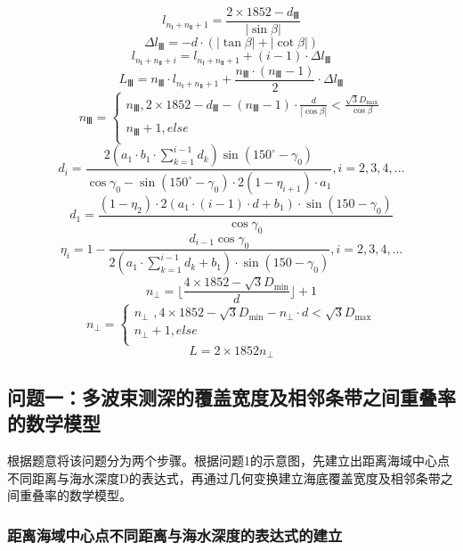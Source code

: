 \documentclass[withoutpreface,bwprint]{cumcmthesis} %
\begin{document}
$$
l_{n_Ⅰ+n_Ⅱ+1}=\frac{2\times 1852-d_Ⅲ}{\left| \sin \beta \right|}
$$
$$
\varDelta l_Ⅲ=-d\cdot \left( \left| \tan \beta \right|+\left| \cot \beta \right| \right) 
$$
$$
l_{n_Ⅰ+n_Ⅱ+i}=l_{n_Ⅰ+n_Ⅱ+1}+\left( i-1 \right) \cdot \varDelta l_Ⅲ
$$
$$
L_Ⅲ=n_Ⅲ\cdot l_{n_Ⅰ+n_Ⅱ+1}+\frac{n_Ⅲ\cdot \left( n_Ⅲ-1 \right)}{2}\cdot \varDelta l_Ⅲ
$$
$$
n_Ⅲ=\begin{cases}
	n_Ⅲ, 2\times 1852-d_Ⅲ-\left( n_Ⅲ-1 \right) \cdot \frac{d}{\left| \cos \beta \right|}<\frac{\sqrt{3}D_{\max}}{\cos \beta}\\
	n_Ⅲ+1, else\\
\end{cases}
$$
$$
d_i=\frac{2\left( a_1\cdot b_1\cdot \sum_{k=1}^{i-1}{d_k} \right) \sin \left( 150^{\circ}-\gamma _0 \right)}{\cos \gamma _0-\sin \left( 150^{\circ}-\gamma _0 \right) \cdot 2\left( 1-\eta _{i+1} \right) \cdot a_1},i=2,3,4,...
$$
$$
d_1=\frac{\left( 1-\eta _2 \right) \cdot 2\left( a_1\cdot \left( i-1 \right) \cdot d+b_1 \right) \cdot \sin \left( 150-\gamma _0 \right)}{\cos \gamma _0}
$$
$$
\eta _i=1-\frac{d_{i-1}\cos \gamma _0}{2\left( a_1\cdot \sum_{k=1}^{i-1}{d_k}+b_1 \right) \cdot \sin \left( 150-\gamma _0 \right)},i=2,3,4,...
$$
$$
n_{\bot}=\lfloor \frac{4\times 1852-\sqrt{3}D_{\min}}{d} \rfloor +1
$$
$$
n_{\bot}=\begin{cases}
	n_{\bot}\,\,, 4\times 1852-\sqrt{3}D_{\min}-n_{\bot}\cdot d<\sqrt{3}D_{\max}\\
	n_{\bot}+1, else\\
\end{cases}
$$
$$
L=2\times 1852n_{\bot}
$$
\subsection{问题一：多波束测深的覆盖宽度及相邻条带之间重叠率的数学模型}
根据题意将该问题分为两个步骤。根据问题1的示意图，先建立出距离海域中心点不同距离与海水深度D的表达式，再通过几何变换建立海底覆盖宽度及相邻条带之间重叠率的数学模型。
\subsubsection{距离海域中心点不同距离与海水深度的表达式的建立}
\end{document}
